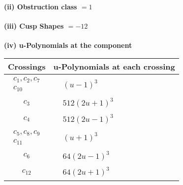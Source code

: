 \documentclass[1p]{elsarticle_modified}
\theoremstyle{definition}
\begin{document}
\flushleft \textbf{(ii) Obstruction class $= 1$}\\~\\
\flushleft \textbf{(iii) Cusp Shapes $= -12$}\\~\\
\newpage\renewcommand{\arraystretch}{1}
\flushleft \textbf{(iv) u-Polynomials at the component}\newline \\
\begin{tabular}{m{50pt}|m{274pt}}
Crossings & \hspace{64pt}u-Polynomials at each crossing \\
\hline $$\begin{aligned}c_{1},c_{2},c_{7}\\c_{10}\end{aligned}$$&$\begin{aligned}
&(u-1)^3
\end{aligned}$\\
\hline $$\begin{aligned}c_{3}\end{aligned}$$&$\begin{aligned}
&512(2 u+1)^3
\end{aligned}$\\
\hline $$\begin{aligned}c_{4}\end{aligned}$$&$\begin{aligned}
&512(2 u-1)^3
\end{aligned}$\\
\hline $$\begin{aligned}c_{5},c_{8},c_{9}\\c_{11}\end{aligned}$$&$\begin{aligned}
&(u+1)^3
\end{aligned}$\\
\hline $$\begin{aligned}c_{6}\end{aligned}$$&$\begin{aligned}
&64(2 u-1)^3
\end{aligned}$\\
\hline $$\begin{aligned}c_{12}\end{aligned}$$&$\begin{aligned}
&64(2 u+1)^3
\end{aligned}$\\
\hline
\end{tabular}\\~\\
\end{document}
